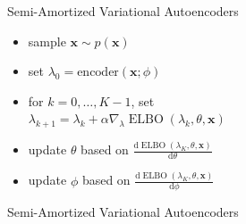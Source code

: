 \documentclass{beamer}		%
\newcommand{\dd}{\mathrm{d}}
\DeclareMathOperator*{\ELBO}{ELBO}
\begin{document}
\begin{frame}{Semi-Amortized Variational Autoencoders}

\begin{itemize}
    \item sample $\bm{x}\sim p(\bm{x})$
    \item set $\lambda_0 = \text{encoder}(\bm{x};\phi)$
    \item for $k=0,\ldots,K-1$, set \\ $\lambda_{k+1} = \lambda_k + \alpha \nabla_{\lambda} \ELBO(\lambda_k, \theta, \bm{x})$
    \item update $\theta$ based on $\frac{\dd \ELBO(\lambda_K, \theta, \bm{x})}{\dd \theta}$
    \item update $\phi$ based on $\frac{\dd \ELBO(\lambda_K, \theta, \bm{x})}{\dd \phi}$
\end{itemize}

\end{frame}



\begin{frame}{Semi-Amortized Variational Autoencoders}

\begin{figure}[H]
\centering
{}
\label{fig1}
\end{figure}

\end{frame}
\end{document}
